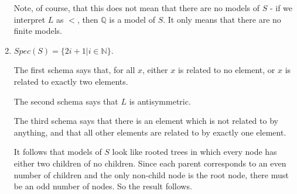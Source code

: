 \begin{mdframed}[linewidth=1]
\begin{enumerate}
   Note, of course, that this does not mean that there are no models of $S$ - if we interpret $L$ as $<$, then $\mathbb{Q}$ is a model of $S$. It only means that there are no finite models. 

    \item $Spec(S) = \{2i + 1 | i \in \mathbb{N}\}$. 

   The first schema says that, for all $x$, either $x$ is related to no element, or $x$ is related to exactly two elements. 

   The second schema says that $L$ is antisymmetric. 

   The third schema says that there is an element which is not related to by anything, and that all other elements are related to by exactly one element.

   It follows that models of $S$ look like rooted trees in which every node has either two children of no children. Since each parent corresponds to an even number of children and the only non-child node is the root node, there must be an odd number of nodes. So the result follows. 
   \fi
\end{enumerate}
\end{mdframed}